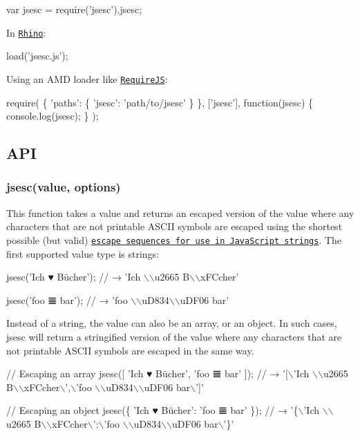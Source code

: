 \begin{DoxyCode}
var jsesc = require('jsesc').jsesc;
\end{DoxyCode}


In \href{http://www.mozilla.org/rhino/}{\tt Rhino}\+:


\begin{DoxyCode}
load('jsesc.js');
\end{DoxyCode}


Using an A\+MD loader like \href{http://requirejs.org/}{\tt Require\+JS}\+:


\begin{DoxyCode}
require(
  \{
    'paths': \{
      'jsesc': 'path/to/jsesc'
    \}
  \},
  ['jsesc'],
  function(jsesc) \{
    console.log(jsesc);
  \}
);
\end{DoxyCode}


\subsection*{A\+PI}

\subsubsection*{{\ttfamily jsesc(value, options)}}

This function takes a value and returns an escaped version of the value where any characters that are not printable A\+S\+C\+II symbols are escaped using the shortest possible (but valid) \href{http://mathiasbynens.be/notes/javascript-escapes}{\tt escape sequences for use in Java\+Script strings}. The first supported value type is strings\+:


\begin{DoxyCode}
jsesc('Ich ♥ Bücher');
// → 'Ich \(\backslash\)\(\backslash\)u2665 B\(\backslash\)\(\backslash\)xFCcher'

jsesc('foo 𝌆 bar');
// → 'foo \(\backslash\)\(\backslash\)uD834\(\backslash\)\(\backslash\)uDF06 bar'
\end{DoxyCode}


Instead of a string, the {\ttfamily value} can also be an array, or an object. In such cases, {\ttfamily jsesc} will return a stringified version of the value where any characters that are not printable A\+S\+C\+II symbols are escaped in the same way.


\begin{DoxyCode}
// Escaping an array
jsesc([
  'Ich ♥ Bücher', 'foo 𝌆 bar'
]);
// → '[\(\backslash\)'Ich \(\backslash\)\(\backslash\)u2665 B\(\backslash\)\(\backslash\)xFCcher\(\backslash\)',\(\backslash\)'foo \(\backslash\)\(\backslash\)uD834\(\backslash\)\(\backslash\)uDF06 bar\(\backslash\)']'

// Escaping an object
jsesc(\{
  'Ich ♥ Bücher': 'foo 𝌆 bar'
\});
// → '\{\(\backslash\)'Ich \(\backslash\)\(\backslash\)u2665 B\(\backslash\)\(\backslash\)xFCcher\(\backslash\)':\(\backslash\)'foo \(\backslash\)\(\backslash\)uD834\(\backslash\)\(\backslash\)uDF06 bar\(\backslash\)'\}'
\end{DoxyCode}


